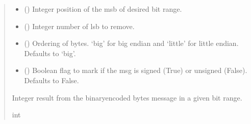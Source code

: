 \documentclass[letterpaper,10pt,english]{sphinxmanual}
\begin{document}
\begin{fulllineitems}
\begin{fulllineitems}
\begin{quote}
\begin{description}
\begin{itemize}
\item {} 
\sphinxAtStartPar
{} () \textendash{} Integer position of the msb of desired bit range.

\item {} 
\sphinxAtStartPar
{} () \textendash{} Integer number of lsb to remove.

\item {} 
\sphinxAtStartPar
{} (\sphinxstyleliteralemphasis{\sphinxupquote{, }}) \textendash{} Ordering of bytes. ‘big’ for big endian and ‘little’ for little                 endian. Defaults to ‘big’.

\item {} 
\sphinxAtStartPar
{} (\sphinxstyleliteralemphasis{\sphinxupquote{, }}) \textendash{} Boolean flag to mark if the msg is signed (True) or unsigned (False).                 Defaults to False.

\end{itemize}

\sphinxAtStartPar
Integer result from the binary\sphinxhyphen{}encoded bytes message in a given bit range.

\sphinxAtStartPar
int

\end{description}\end{quote}

\end{fulllineitems}



\end{fulllineitems}
\end{document}

